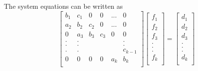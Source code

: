 \documentclass[12pt, oneside]{book}
\theoremstyle{plain}
\theoremstyle{definition}
\begin{document}
The system equations can be written as
$$
\begin{bmatrix}  
b_1 & c_1 & 0 & 0 & ... & 0 \\ 
a_2 & b_2 & c_2 & 0 & ... & 0 \\ 
0 & a_3 & b_3 & c_3 & 0 & 0 \\ 
. & . &  &  &  & . \\ 
. & . &  &  &  & . \\ 
. & . &  &  &  & c_{k-1} \\ 
0 & 0 & 0 & 0 & a_k & b_k \\ 
\end{bmatrix} \begin{bmatrix}  
f_1 \\ 
f_2 \\ 
f_3 \\ 
.\\ 
.\\ 
.\\ 
f_k \\ 
\end{bmatrix} = \begin{bmatrix} 
d_1 \\ 
d_2 \\ 
d_3 \\ 
.\\ 
.\\ 
.\\ 
d_k \\ 
\end{bmatrix}
$$
\end{document}
